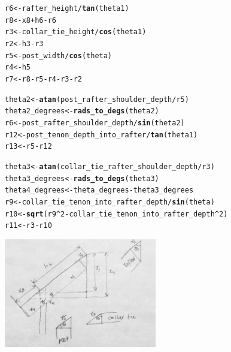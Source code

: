 \documentclass{article}\usepackage[]{graphicx}\usepackage[]{xcolor}
\makeatletter
\newcommand{\hlnum}[1]{\textcolor[rgb]{0.686,0.059,0.569}{#1}}%
\newcommand{\hlopt}[1]{\textcolor[rgb]{0,0,0}{#1}}%
\newcommand{\hlstd}[1]{\textcolor[rgb]{0.345,0.345,0.345}{#1}}%
\newcommand{\hlkwb}[1]{\textcolor[rgb]{0.69,0.353,0.396}{#1}}%
\newcommand{\hlkwd}[1]{\textcolor[rgb]{0.737,0.353,0.396}{\textbf{#1}}}%
\newenvironment{kframe}{%
 \def\at@end@of@kframe{}%
 \ifinner\ifhmode%
  \def\at@end@of@kframe{\end{minipage}}%
  \begin{minipage}{\columnwidth}%
 \fi\fi%
 \def\FrameCommand##1{\hskip\@totalleftmargin \hskip-\fboxsep
 \colorbox{shadecolor}{##1}\hskip-\fboxsep
     \hskip-\linewidth \hskip-\@totalleftmargin \hskip\columnwidth}%
 \MakeFramed {\advance\hsize-\width
   \@totalleftmargin\z@ \linewidth\hsize
   \@setminipage}}%
 {\par\unskip\endMakeFramed%
 \at@end@of@kframe}
\newenvironment{knitrout}{}{} %
\makeatother
\begin{document}
\begin{knitrout}
\color{fgcolor}\begin{kframe}
\begin{alltt}
\hlstd{r6} \hlkwb{<-} \hlstd{rafter_height}\hlopt{/}\hlkwd{tan}\hlstd{(theta1)}
\hlstd{r8} \hlkwb{<-} \hlstd{x8} \hlopt{+} \hlstd{h6} \hlopt{-} \hlstd{r6}
\hlstd{r3} \hlkwb{<-} \hlstd{collar_tie_height}\hlopt{/}\hlkwd{cos}\hlstd{(theta1)}
\hlstd{r2} \hlkwb{<-} \hlstd{h3} \hlopt{-} \hlstd{r3}
\hlstd{r5} \hlkwb{<-} \hlstd{post_width}\hlopt{/}\hlkwd{cos}\hlstd{(theta)}
\hlstd{r4} \hlkwb{<-} \hlstd{h5}
\hlstd{r7} \hlkwb{<-} \hlstd{r8} \hlopt{-} \hlstd{r5} \hlopt{-} \hlstd{r4} \hlopt{-} \hlstd{r3} \hlopt{-} \hlstd{r2}

\hlstd{theta2} \hlkwb{<-} \hlkwd{atan}\hlstd{(post_rafter_shoulder_depth}\hlopt{/}\hlstd{r5)}
\hlstd{theta2_degrees} \hlkwb{<-} \hlkwd{rads_to_degs}\hlstd{(theta2)}
\hlstd{r6} \hlkwb{<-} \hlstd{post_rafter_shoulder_depth}\hlopt{/}\hlkwd{sin}\hlstd{(theta2)}
\hlstd{r12} \hlkwb{<-} \hlstd{post_tenon_depth_into_rafter}\hlopt{/}\hlkwd{tan}\hlstd{(theta1)}
\hlstd{r13} \hlkwb{<-} \hlstd{r5} \hlopt{-} \hlstd{r12}

\hlstd{theta3} \hlkwb{<-} \hlkwd{atan}\hlstd{(collar_tie_rafter_shoulder_depth}\hlopt{/}\hlstd{r3)}
\hlstd{theta3_degrees} \hlkwb{<-} \hlkwd{rads_to_degs}\hlstd{(theta3)}
\hlstd{theta4_degrees} \hlkwb{<-} \hlstd{theta_degrees} \hlopt{-} \hlstd{theta3_degrees}
\hlstd{r9} \hlkwb{<-} \hlstd{collar_tie_tenon_into_rafter_depth}\hlopt{/}\hlkwd{sin}\hlstd{(theta)}
\hlstd{r10} \hlkwb{<-} \hlkwd{sqrt}\hlstd{(r9}\hlopt{^}\hlnum{2} \hlopt{-} \hlstd{collar_tie_tenon_into_rafter_depth}\hlopt{^}\hlnum{2}\hlstd{)}
\hlstd{r11} \hlkwb{<-} \hlstd{r3} \hlopt{-} \hlstd{r10}
\end{alltt}
\end{kframe}
\end{knitrout}

\begin{center}
	\includegraphics[width=0.5\textwidth]{images/rafter_length}
\end{center}
\end{document}

